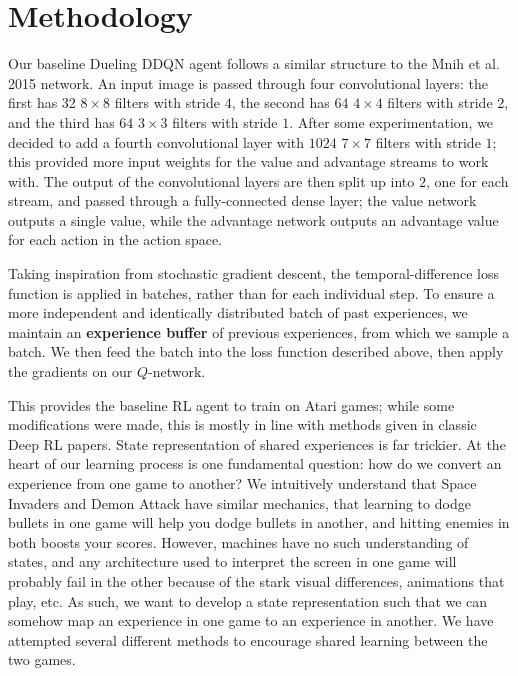 \documentclass{article} %
\begin{document}
\section{Methodology}


Our baseline Dueling DDQN agent follows a similar structure to the Mnih et al. 2015 network. An
input image is passed through four convolutional layers: the first has 32 $8\times 8$ filters with
stride $4$, the second has $64$ $4\times 4$ filters with stride $2$, and the third has $64$ $3\times
3$ filters with stride $1$. After some experimentation, we decided to add a fourth convolutional
layer with $1024$ $7\times 7$ filters with stride $1$; this provided more input weights for the
value and advantage streams to work with. The output of the convolutional layers are then split up
into $2$, one for each stream, and passed through a fully-connected dense layer; the value network
outputs a single value, while the advantage network outputs an advantage value for each action in
the action space.

Taking inspiration from stochastic gradient descent, the temporal-difference loss function is
applied in batches, rather than for each individual step. To ensure a more independent and
identically distributed batch of past experiences, we maintain an \textbf{experience buffer} of
previous experiences, from which we sample a batch. We then feed the batch into the loss function
described above, then apply the gradients on our $Q$-network.

This provides the baseline RL agent to train on Atari games; while some modifications were made,
this is mostly in line with methods given in classic Deep RL papers. State representation of shared
experiences is far trickier. At the heart of our learning process is one fundamental question: how
do we convert an experience from one game to another? We intuitively understand that Space Invaders
and Demon Attack have similar mechanics, that learning to dodge bullets in one game will help you
dodge bullets in another, and hitting enemies in both boosts your scores. However, machines have no
such understanding of states, and any architecture used to interpret the screen in one game will
probably fail in the other because of the stark visual differences, animations that play, etc. As
such, we want to develop a state representation such that we can somehow map an experience in one
game to an experience in another. We have attempted several different methods to encourage shared
learning between the two games.
\end{document}
